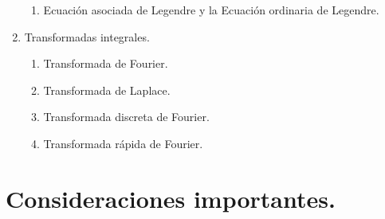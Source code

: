 \documentclass[12pt]{article}
\numberwithin{equation}{section}
\begin{document}
\begin{enumerate}
\begin{enumerate}
\item Ecuación asociada de Legendre y la Ecuación ordinaria de Legendre.
\end{enumerate}
\item Transformadas integrales.
\begin{enumerate}
\item Transformada de Fourier.
\item Transformada de Laplace.
\item Transformada discreta de Fourier.
\item Transformada rápida de Fourier.
\end{enumerate}
\end{enumerate}

\section{Consideraciones importantes.}
\end{document}
